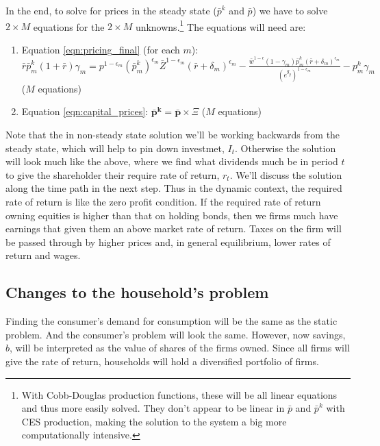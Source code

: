 \documentclass[letterpaper,12pt]{article}
\theoremstyle{definition}
\begin{document}
\begin{spacing}{1.5}
In the end, to solve for prices in the steady state ($\bar{p}^{k}$ and $\bar{p}$) we have to solve $2\times M$ equations for the $2\times M$ unknowns.\footnote{With Cobb-Douglas production functions, these will be all linear equations and thus more easily solved.  They don't appear to be linear in $\bar{p}$ and $\bar{p}^{k}$ with CES production, making the solution to the system a big more computationally intensive.}  The equations will need are:

\begin{enumerate}
\item Equation \ref{eqn:pricing_final} (for each $m$):  $ \bar{r}\bar{p}^{k}_{m}(1+\bar{r})\gamma_{m}  = p^{1-\epsilon_{m}}\left(\bar{p}^{k}_{m}\right)^{\epsilon_{m}}\bar{Z}^{1-\epsilon_{m}}(\bar{r}+\delta_{m})^{\epsilon_{m}} - \frac{\bar{w}^{1-\epsilon}(1-\gamma_{m})\bar{p}^{k}_{m}(\bar{r}+\delta_{m})^{\epsilon_{m}}}{\left(e^{g_{y}}\right)^{1-\epsilon_{m}}} - p^{k}_{m}\gamma_{m}$ ($M$ equations)
\item Equation \ref{eqn:capital_prices}: $\boldsymbol{\bar{p}^{k}} =\boldsymbol{\bar{p}} \times \Xi$ ($M$ equations)
\end{enumerate} 

Note that the in non-steady state solution we'll be working backwards from the steady state, which will help to pin down investmet, $I_{t}$.  Otherwise the solution will look much like the above, where we find what dividends much be in period $t$ to give the shareholder their require rate of return, $r_{t}$.  We'll discuss the solution along the time path in the next step.  Thus in the dynamic context, the required rate of return is like the zero profit condition.  If the required rate of return owning equities is higher than that on holding bonds, then we firms much have earnings that given them an above market rate of return.  Taxes on the firm will be passed through by higher prices and, in general equilibrium, lower rates of return and wages.

\subsection*{Changes to the household's problem}

Finding the consumer's demand for consumption will be the same as the static problem.  And the consumer's problem will look the same.  However, now savings, $b$, will be interpreted as the value of shares of the firms owned.  Since all firms will give the rate of return, households will hold a diversified portfolio of firms.  


\end{spacing}
\end{document}
